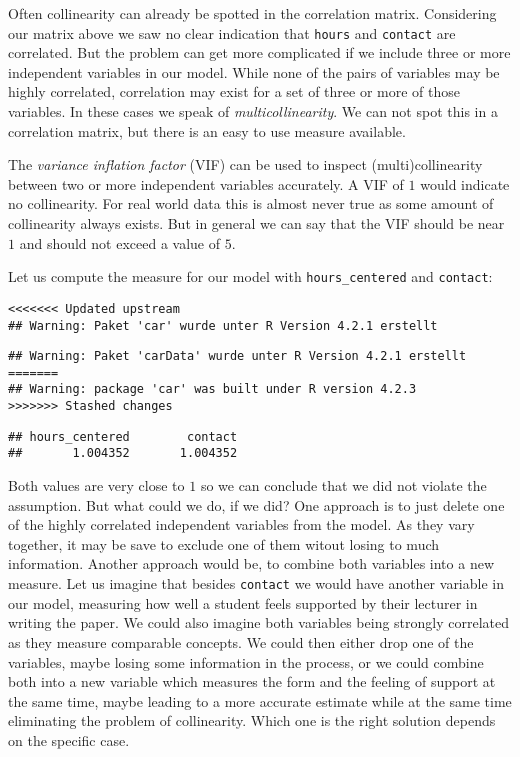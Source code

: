 \documentclass[
]{book}
\begin{document}
Often collinearity can already be spotted in the correlation matrix. Considering
our matrix above we saw no clear indication that \texttt{hours} and \texttt{contact} are
correlated. But the problem can get more complicated if we include three or more
independent variables in our model. While none of the pairs of variables may be
highly correlated, correlation may exist for a set of three or more of those
variables. In these cases we speak of \emph{multicollinearity}. We can not spot this
in a correlation matrix, but there is an easy to use measure available.

The \emph{variance inflation factor} (VIF) can be used to inspect (multi)collinearity
between two or more independent variables accurately. A VIF of \(1\) would
indicate no collinearity. For real world data this is almost never true as some
amount of collinearity always exists. But in general we can say that the VIF
should be near \(1\) and should not exceed a value of \(5\).

Let us compute the measure for our model with \texttt{hours\_centered} and \texttt{contact}:

\begin{verbatim}
<<<<<<< Updated upstream
## Warning: Paket 'car' wurde unter R Version 4.2.1 erstellt
\end{verbatim}

\begin{verbatim}
## Warning: Paket 'carData' wurde unter R Version 4.2.1 erstellt
=======
## Warning: package 'car' was built under R version 4.2.3
>>>>>>> Stashed changes
\end{verbatim}

\begin{verbatim}
## hours_centered        contact 
##       1.004352       1.004352
\end{verbatim}

Both values are very close to \(1\) so we can conclude that we did not violate
the assumption. But what could we do, if we did? One approach is to just delete
one of the highly correlated independent variables from the model. As they vary
together, it may be save to exclude one of them witout losing to much
information. Another approach would be, to combine both variables into a new
measure. Let us imagine that besides \texttt{contact} we would have another variable in
our model, measuring how well a student feels supported by their lecturer in
writing the paper. We could also imagine both variables being strongly
correlated as they measure comparable concepts. We could then either drop one of
the variables, maybe losing some information in the process, or we could combine
both into a new variable which measures the form and the feeling of support at
the same time, maybe leading to a more accurate estimate while at the same time
eliminating the problem of collinearity. Which one is the right solution
depends on the specific case.
\end{document}
